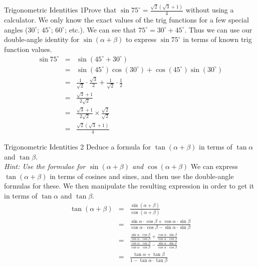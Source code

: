 \begin{wex}{Trigonometric Identities 1}{Prove that $\sin 75^\circ=\frac{\sqrt{2}(\sqrt{3}+1)}{4}$ without using a calculator.}
{
We only know the exact values of the trig functions for a few special angles ($30^\circ$; $45^\circ$; $60^\circ$; etc.). We can see that $75^\circ=30^\circ+45^\circ$. Thus we can use our double-angle identity for $\sin(\alpha+\beta)$ to express $\sin 75^\circ$ in terms of known trig function values.
\begin{eqnarray*}
\sin 75^\circ&=&\sin(45^\circ+30^\circ)\\
&=&\sin(45^\circ)\cos(30^\circ)+\cos(45^\circ)\sin(30^\circ)\\
&=&\frac{1}{\sqrt{2}}\cdot\frac{\sqrt{3}}{2}+\frac{1}{\sqrt{2}}\cdot\frac{1}{2}\\\
&=&\frac{\sqrt{3}+1}{2\sqrt{2}}\\
&=&\frac{\sqrt{3}+1}{2\sqrt{2}}\times\frac{\sqrt{2}}{\sqrt{2}}\\
&=&\frac{\sqrt{2}(\sqrt{3}+1)}{4}
\end{eqnarray*}
}
\end{wex}

\begin{wex}{Trigonometric Identities 2}
{Deduce a formula for $\tan(\alpha+\beta)$ in terms of $\tan\alpha$ and $\tan\beta$.\\
\emph{Hint: Use the formulae for $\sin(\alpha+\beta)$ and $\cos(\alpha+\beta)$} }
{
We can express $\tan(\alpha+\beta)$ in terms of cosines and sines, and then use the double-angle formulas for these. We then manipulate the resulting expression in order to get it in terms of $\tan\alpha$ and $\tan\beta$.
\westep{Execute strategy}
\begin{eqnarray*}
\tan(\alpha+\beta)&=&\frac{\sin(\alpha+\beta)}{\cos(\alpha+\beta)}\\
&=&\frac{\sin\alpha\cdot\cos\beta+\cos\alpha\cdot\sin\beta}{\cos\alpha\cdot\cos\beta-\sin\alpha\cdot\sin\beta}\\
&=&\frac{\frac{\sin\alpha\cdot\cos\beta}{\cos\alpha\cdot\cos\beta}+\frac{\cos\alpha\cdot\sin\beta}{\cos\alpha\cdot\cos\beta}}{\frac{\cos\alpha\cdot\cos\beta}{\cos\alpha\cdot\cos\beta}-\frac{\sin\alpha\cdot\sin\beta}{\cos\alpha\cdot\cos\beta}}\\
&=& \frac{\tan\alpha+\tan\beta}{1-\tan\alpha\cdot\tan\beta}
\end{eqnarray*}
}
\end{wex}

